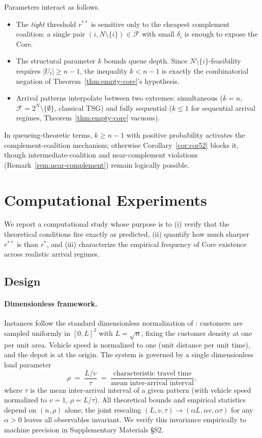 \documentclass[11pt]{article}
\theoremstyle{plain}
\theoremstyle{definition}
\theoremstyle{remark}
\newcommand{\F}{\mathcal{F}}
\begin{document}
Parameters interact as follows.
\begin{itemize}[leftmargin=1.5em]
\item The \emph{tight} threshold $r^{\ast\ast}$ is sensitive only to the cheapest complement coalition: a single pair $(i,N\setminus\{i\})\in\F$ with small $\delta_i$ is enough to expose the Core.
\item The structural parameter $k$ bounds queue depth. Since $N\setminus\{i\}$-feasibility requires $|U_t|\ge n-1$, the inequality $k<n-1$ is exactly the combinatorial negation of Theorem~\ref{thm:empty-core}'s hypothesis.
\item Arrival patterns interpolate between two extremes: simultaneous ($k=n$, $\F=2^N\setminus\{\emptyset\}$, classical TSG) and fully sequential ($k\le 1$ for sequential arrival regimes, Theorem~\ref{thm:empty-core} vacuous).
\end{itemize}
In queueing-theoretic terms, $k\ge n-1$ with positive probability activates the complement-coalition mechanism; otherwise Corollary~\ref{cor:cor52} blocks it, though intermediate-coalition and near-complement violations (Remark~\ref{rem:near-complement}) remain logically possible.

\section{Computational Experiments}
\label{sec:experiments}

We report a computational study whose purpose is to (i) verify that the theoretical conditions fire exactly as predicted, (ii) quantify how much sharper $r^{\ast\ast}$ is than $r^{\ast}$, and (iii) characterize the empirical frequency of Core existence across realistic arrival regimes.

\subsection{Design}
\label{ssec:design}

\paragraph{Dimensionless framework.} Instances follow the standard dimensionless normalization of \citet{steele1997probability}: customers are sampled uniformly in $[0,L]^2$ with $L=\sqrt{n}$, fixing the customer density at one per unit area. Vehicle speed is normalized to one (unit distance per unit time), and the depot is at the origin. The system is governed by a single dimensionless load parameter
\[
  \rho \;=\; \frac{L/v}{\tau} \;=\; \frac{\text{characteristic travel time}}{\text{mean inter-arrival interval}},
\]
where $\tau$ is the mean inter-arrival interval of a given pattern (with vehicle speed normalized to $v=1$, $\rho = L/\tau$). All theoretical bounds and empirical statistics depend on $(n,\rho)$ alone; the joint rescaling $(L,v,\tau)\to(\alpha L,\alpha v,\alpha\tau)$ for any $\alpha>0$ leaves all observables invariant. We verify this invariance empirically to machine precision in Supplementary Materials \S S2.
\end{document}
